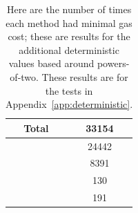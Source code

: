 \begin{table}[H]
\centering
\begin{tabular}{|c|S[table-format=5.0]|}
\hline
Total & 33154 \\
\hline
{} \UnrolledThree{} &  24442 \\
                      \WhileOne{}      &                        8391 \\
                      \WhileTwo{}      &                         130 \\
                      \WhileThree{}    &                         191 \\
\hline
\end{tabular}
\caption[Minimal Gas Costs Statistics]{Here are the number of times
    each method had minimal gas cost;
    these are results for the additional deterministic values
    based around powers-of-two.
    These results are for the tests in Appendix~\ref{app:deterministic}.
    }
\label{table:minimal_gas_costs_ed}
\end{table}
